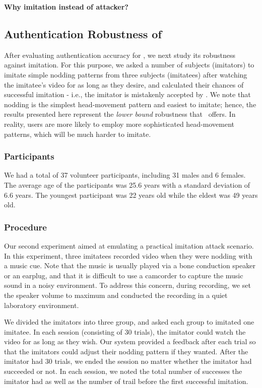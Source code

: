 \textbf{Why imitation instead of attacker?}

\subsection{Authentication Robustness of \systemname} After evaluating authentication accuracy for \systemname, we next study its robustness against imitation. For this purpose, we asked a number of subjects (imitators) to imitate simple nodding patterns from three subjects (imitatees) after watching the imitatee's video for as long as they desire, and calculated their chances of successful imitation - i.e., the imitator is mistakenly accepted by \systemname. We note that nodding is the simplest head-movement pattern and easiest to imitate; hence, the results presented here represent the \emph{lower bound} robustness that \systemname~offers. In reality, users are more likely to employ more sophisticated head-movement patterns, which will be much harder to imitate.

\subsubsection{Participants}
We had a total of 37 volunteer participants, including 31 males and 6 females. The average age of the participants was 25.6 years with a standard deviation
of 6.6 years. The youngest participant was 22 years old while the eldest was 49 years old.

\subsubsection{Procedure}
Our second experiment aimed at emulating a practical imitation attack scenario. In this experiment, three imitatees recorded video when they were nodding with a music cue. Note that the music is usually played via a bone conduction speaker or an earplug, and that it is difficult to use a camcorder to capture the music sound in a noisy environment. To address this concern, during recording, we set the speaker volume to maximum and conducted the recording in a quiet laboratory environment.

We divided the imitators into three group, and asked each group to imitated one imitatee. In each session (consisting of 30 trials), the imitator could watch the video for as long as they wish. Our system provided a feedback after each trial so that the imitators could adjust their nodding pattern if they wanted. After the imitator had 30 trials,
we ended the session no matter whether the imitator had succeeded or not. In each session, we noted the total number of successes the imitator had as well as the number of trail before the first successful imitation. %


